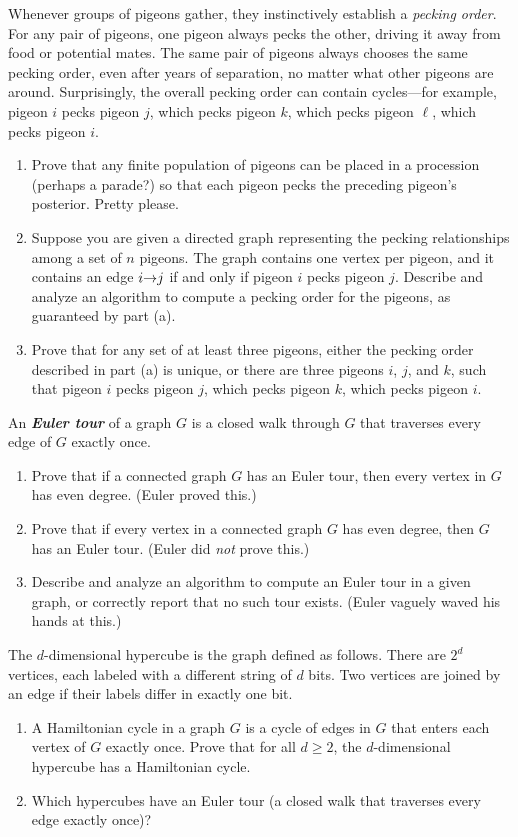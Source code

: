 \begin{exercises}
\item Whenever groups of pigeons gather, they instinctively establish a \textit{pecking order}.
For any pair of pigeons, one pigeon always pecks the other, driving it away from food or potential mates.
The same pair of pigeons always chooses the same pecking order, even after years of separation, no matter what other pigeons are around.
Surprisingly, the overall pecking order can contain cycles---for example, pigeon $i$ pecks pigeon $j$, which pecks pigeon $k$, which pecks pigeon $\ell$, which pecks pigeon $i$.
\begin{enumerate}
\item Prove that any finite population of pigeons can be placed in a procession (perhaps a parade?) so that each pigeon pecks the preceding pigeon’s posterior.
Pretty please.
\item Suppose you are given a directed graph representing the pecking relationships among a set of $n$ pigeons.
The graph contains one vertex per pigeon, and it contains an edge $i\mathord{\rightarrow}j$ if and only if pigeon $i$ pecks pigeon $j$.
Describe and analyze an algorithm to compute a pecking order for the pigeons, as guaranteed by part (a).
\item Prove that for any set of at least three pigeons, either the pecking order described in part (a) is unique, or there are three pigeons $i$, $j$, and $k$, such that pigeon $i$ pecks pigeon $j$, which pecks pigeon $k$, which pecks pigeon $i$.
\end{enumerate}

\item An \textbf{\textit{Euler tour}} of a graph $G$ is a closed walk through $G$ that traverses every edge of $G$ exactly once.
\begin{enumerate}
\item Prove that if a connected graph $G$ has an Euler tour, then every vertex in $G$ has even degree.
(Euler proved this.)
\item Prove that if every vertex in a connected graph $G$ has even degree, then $G$ has an Euler tour.
(Euler did \textit{not} prove this.)
\item Describe and analyze an algorithm to compute an Euler tour in a given graph, or correctly report that no such tour exists.
(Euler vaguely waved his hands at this.)
\end{enumerate}

\item The $d$-dimensional hypercube is the graph defined as follows.
There are $2^d$ vertices, each labeled with a different string of $d$ bits.
Two vertices are joined by an edge if their labels differ in exactly one bit.
\begin{enumerate}
\item A Hamiltonian cycle in a graph $G$ is a cycle of edges in $G$ that enters each vertex of $G$ exactly once.
Prove that for all $d \ge 2$, the $d$-dimensional hypercube has a Hamiltonian cycle.
\item Which hypercubes have an Euler tour (a closed walk that traverses every edge exactly once)?
\end{enumerate}


\end{exercises}
